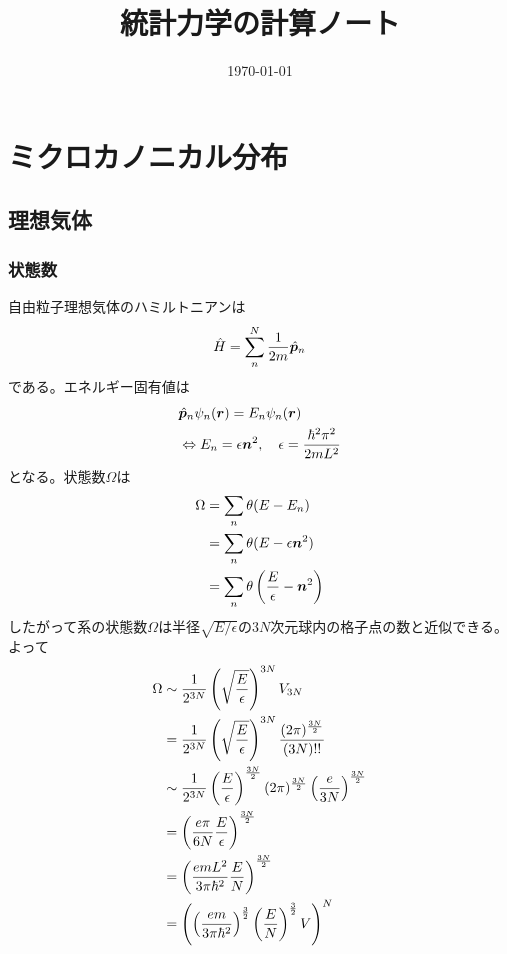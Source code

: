\documentclass{jsarticle}  %
\title{統計力学の計算ノート} %
\author{}%
\date{\today}  %
\numberwithin{equation}{section} %
\numberwithin{figure}{section}
\begin{document}
\maketitle %
\tableofcontents %

\newpage
\section{ミクロカノニカル分布}
\subsection{理想気体}
\subsubsection{状態数}
    自由粒子理想気体のハミルトニアンは
    \begin{align}
        \hat{H} = \sum_n^N \frac{1}{2m} \hat{\bm{p}}_n \notag
    \end{align}
    である。エネルギー固有値は
    \begin{align}
        &\hat{\bm{p}}_n \psi_n(\bm{r}) = E_n \psi_n(\bm{r}) \notag \\
        &\Leftrightarrow E_n = \epsilon \bm{n}^2,\quad \epsilon = \frac{\hbar^2 \pi^2}{2mL^2} \notag 
    \end{align}
    となる。状態数$\Omega$は
    \begin{align}
        \Omega &= \sum_n \theta(E - E_n) \notag \\
        &= \sum_n \theta (E - \epsilon \bm{n}^2) \notag \\
        &= \sum_n \theta \left( \frac{E}{\epsilon} - \bm{n}^2 \right) \notag 
    \end{align}
    したがって系の状態数$\Omega$は半径$\sqrt{E/\epsilon}$の$3N$次元球内の格子点の数と近似できる。よって
    \begin{align}
        \Omega &\sim \frac{1}{2^{3N}} \left( \sqrt{\frac{E}{\epsilon}} \right)^{3N} V_{3N}\notag \\
        &= \frac{1}{2^{3N}} \left( \sqrt{\frac{E}{\epsilon}} \right)^{3N} \frac{(2\pi)^{\frac{3N}{2}}}{(3N)!!} \notag \\
        &\sim \frac{1}{2^{3N}} \left( \frac{E}{\epsilon} \right)^{\frac{3N}{2}} (2\pi)^{\frac{3N}{2}} \left( \frac{e}{3N} \right)^{\frac{3N}{2}} \notag \\
        &=\left( \frac{e\pi }{6 N} \frac{E}{\epsilon} \right)^{\frac{3N}{2}} \notag \\
        &= \left( \frac{emL^2 }{3 \pi \hbar^2} \frac{E}{N} \right)^{\frac{3N}{2}} \notag \\
        &= \left( \left( \frac{em}{3 \pi \hbar^2} \right)^{\frac{3}{2}} \left( \frac{E}{N} \right)^{\frac{3}{2}} V \right)^{N} \notag 
    \end{align}
\end{document}
